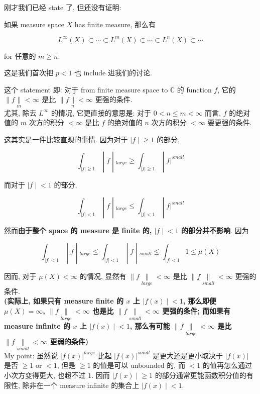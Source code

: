 刚才我们已经 state 了, 但还没有证明:

\begin{theorem}{}

如果 measure space \(X\) has finite measure, 那么有

\[L^{\infty}(X) \subset \cdots \subset L^{m}(X) \subset \cdots \subset L^{n}(X) \subset \cdots\]

for 任意的 \(m \geq n\).

\end{theorem}

这是我们首次把 \(p < 1\) 也 include 进我们的讨论.

这个 statement 即: 对于 from finite measure space to \(\mathbb{C}\) 的 function \(f\), 它的 \(\parallel f\underset{m}{\parallel} < \infty\) 是比 \(\parallel f\underset{n}{\parallel} < \infty\) 更强的条件.\\
尤其, 除去 \(L^{\infty}\) 的情况, 它更直接的意思是: 对于 \(0 < n \leq m < \infty\) 而言, \(f\) 的绝对值的 \(m\) 次方的积分 \(< \infty\) 是比 \(f\) 的绝对值的 \(n\) 次方的积分 \(< \infty\) 要更强的条件.

这其实是一件比较直观的事情. 因为对于 \(\left. |f \middle| \geq 1 \right.\) 的部分,

\[\left. \int_{|f| \geq 1} \middle| f \middle| {}_{large} \geq \int_{|f| \geq 1} \middle| f|^{small} \right.\]

而对于 \(\left. |f \middle| < 1 \right.\) 的部分,

\[\left. \int_{|f| < 1} \middle| f \middle| {}_{large} \leq \int_{|f| < 1} \middle| f|^{small} \right.\]

然而\textbf{由于整个 space 的 measure 是 finite 的, \(\left. |f \middle| < 1 \right.\) 的部分并不影响}. 因为

\[\left. \int_{|f| < 1} \middle| f \middle| {}_{large} \leq \int_{|f| < 1} \middle| f \middle| {}_{small} \leq \int_{|f| < 1}1 \leq \mu(X) \right.\]

因而, 对于 \(\mu(X) < \infty\) 的情况, 显然有 \(\parallel f\underset{large}{\parallel} < \infty\) 是比 \(\parallel f\underset{small}{\parallel} < \infty\) 更强的条件.\\
\textbf{(实际上, 如果只有 measure finite 的 \(x\) 上 \(\left. |f(x) \middle| < 1 \right.\), 那么即便 \(\mu(X) = \infty\), \(\parallel f\underset{large}{\parallel} < \infty\) 也是比 \(\parallel f\underset{small}{\parallel} < \infty\) 更强的条件; 而如果有 measure infinite 的 \(x\) 上 \(\left. |f(x) \middle| < 1 \right.\), 那么有可能 \(\parallel f\underset{large}{\parallel} < \infty\) 是比 \(\parallel f\underset{small}{\parallel} < \infty\) 更弱的条件)}\\
My point: 虽然说 \(|f(x)|^{large}\) 比起 \(|f(x)|^{small}\) 是更大还是更小取决于 \(|f(x)|\) 是否 \(\geq 1\) or \(< 1\), 但是 \(\geq 1\) 的值是可以 unbounded 的, 而 \(< 1\) 的值再怎么通过小次方变得更大, 也超不过 \(1\). 因而 \(\left. |f(x) \middle| \geq 1 \right.\) 的部分通常更能函数积分值的有限性, 除非在一个 measure infinite 的集合上 \(\left. |f(x) \middle| < 1 \right.\).

